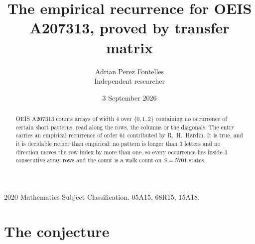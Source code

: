 \documentclass[11pt,a4paper]{article}
\title{The empirical recurrence for OEIS A207313, proved by transfer matrix}
\author{Adrian Perez Fontelles\\ \small Independent researcher}
\date{3 September 2026}
\theoremstyle{plain}
\theoremstyle{definition}
\begin{document}
\maketitle

\begin{abstract}
OEIS A207313 counts arrays of width $4$ over $\{0,1,2\}$ containing no occurrence of certain short
patterns, read along the rows, the columns or the diagonals. The entry carries an empirical
recurrence of order $61$ contributed by R.~H.~Hardin. It is true, and it is decidable
rather than empirical: no pattern is longer than $3$ letters and no direction moves the row
index by more than one, so every occurrence lies inside $3$ consecutive array rows and the
count is a walk count on $S=5701$ states.
\end{abstract}

\noindent\small 2020 Mathematics Subject Classification. 05A15, 68R15, 15A18.\normalsize

\section{The conjecture}
\end{document}
